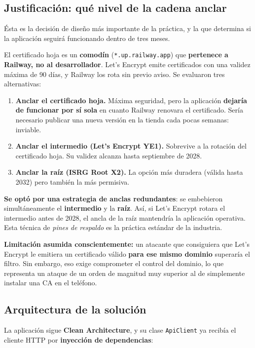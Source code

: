 \documentclass[12pt, a4paper]{article} %
\begin{document}
\subsection{Justificación: qué nivel de la cadena anclar}
\label{sec:justificacion}
Ésta es la decisión de diseño más importante de la práctica, y la que
determina si la aplicación seguirá funcionando dentro de tres meses.

El certificado hoja es un \textbf{comodín} (\texttt{*.up.railway.app}) que
\textbf{pertenece a Railway, no al desarrollador}. Let's Encrypt emite
certificados con una validez máxima de 90 días, y Railway los rota sin previo
aviso. Se evaluaron tres alternativas:

\begin{enumerate}
    \item \textbf{Anclar el certificado hoja.} Máxima seguridad, pero la
    aplicación \textbf{dejaría de funcionar por sí sola} en cuanto Railway
    renovara el certificado. Sería necesario publicar una nueva versión en la
    tienda cada pocas semanas: inviable.
    \item \textbf{Anclar el intermedio (Let's Encrypt YE1).} Sobrevive a la
    rotación del certificado hoja. Su validez alcanza hasta septiembre de 2028.
    \item \textbf{Anclar la raíz (ISRG Root X2).} La opción más duradera
    (válida hasta 2032) pero también la más permisiva.
\end{enumerate}

\textbf{Se optó por una estrategia de anclas redundantes}: se embebieron
simultáneamente el \textbf{intermedio} y la \textbf{raíz}. Así, si Let's
Encrypt rotara el intermedio antes de 2028, el ancla de la raíz mantendría la
aplicación operativa. Esta técnica de \textit{pines de respaldo} es la práctica
estándar de la industria.

\textbf{Limitación asumida conscientemente:} un atacante que consiguiera que
Let's Encrypt le emitiera un certificado válido \textbf{para ese mismo dominio}
superaría el filtro. Sin embargo, eso exige comprometer el control del dominio,
lo que representa un ataque de un orden de magnitud muy superior al de
simplemente instalar una CA en el teléfono.

\subsection{Arquitectura de la solución}
\label{sec:arquitectura}
La aplicación sigue \textbf{Clean Architecture}, y su clase \texttt{ApiClient}
ya recibía el cliente HTTP por \textbf{inyección de dependencias}:
\end{document}
